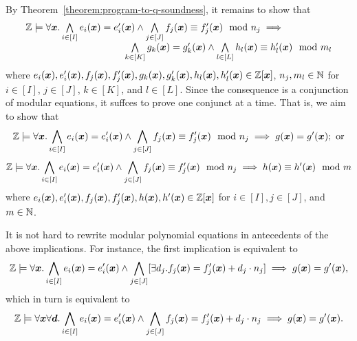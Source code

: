 
By Theorem~\ref{theorem:program-to-q-soundness}, it remains to show 
that 
\[
\begin{array}{l}
  \bbfZ \models \forall \vx. %
  \bigwedge\limits_{i \in [I]} e_i (\vx) = e'_i (\vx) \wedge
  \bigwedge\limits_{j \in [J]} f_j (\vx) \equiv f'_j (\vx) \mod n_j
  \implies
  \\
  \hspace{.3\textwidth}
  \bigwedge\limits_{k \in [K]} g_k (\vx) = g'_k (\vx) \wedge
  \bigwedge\limits_{l \in [L]} h_l (\vx) \equiv h'_l (\vx) \mod m_l
\end{array}
\]
where
$e_i (\vx), e'_i (\vx), f_j (\vx), f'_j (\vx),
 g_k (\vx), g'_k (\vx), h_l (\vx), h'_l (\vx) \in
 \bbfZ[\vx]$, $n_j, m_l \in \mathbb{N}$ for $i \in [I]$, $j \in [J]$, $k
 \in [K]$, and $l \in [L]$. Since the
consequence is a conjunction of modular equations, it suffces to 
prove one conjunct at a time. That is, we aim to show that 
\begin{equation*}
  \label{eq:polynomial-equation-implicant}
  \bbfZ \models \forall \vx. %
  \bigwedge\limits_{i \in [I]} e_i (\vx) = e'_i (\vx) \wedge
  \bigwedge\limits_{j \in [J]} f_j (\vx) \equiv f'_j (\vx) \mod n_j
  \implies
  g (\vx) = g' (\vx); \textmd{ or}
\end{equation*}
 \begin{equation*}
   \label{eq:modular-polynomial-equation-implicant}
   \bbfZ \models \forall \vx. %
   \bigwedge\limits_{i \in [I]} e_i (\vx) = e'_i (\vx) \wedge
   \bigwedge\limits_{j \in [J]} f_j (\vx) \equiv f'_j (\vx) \mod n_j
   \implies
   h (\vx) \equiv h' (\vx) \mod m
 \end{equation*}
where $e_i (\vx), e'_i (\vx), f_j (\vx), f'_j (\vx), h (\vx), h' (\vx)
\in \bbfZ[\vx]$ for $i \in [I], j \in [J]$, and $m \in \mathbb{N}$. 

It is not hard to rewrite modular polynomial equations in antecedents
of the above implications. For instance, the first implication is
equivalent to 
\[
\bbfZ \models \forall \vx. %
\bigwedge\limits_{i \in [I]} e_i (\vx) = e'_i (\vx) \wedge
\bigwedge\limits_{j \in [J]} [\exists d_j. f_j (\vx) = f'_j (\vx) + d_j \cdot n_j]
\implies
g (\vx) = g' (\vx),
\]
which in turn is equivalent to
\[
\bbfZ \models \forall \vx \forall \vd. %
\bigwedge\limits_{i \in [I]} e_i (\vx) = e'_i (\vx) \wedge
\bigwedge\limits_{j \in [J]} f_j (\vx) = f'_j (\vx) + d_j \cdot n_j
\implies
g (\vx) = g' (\vx).
\]

